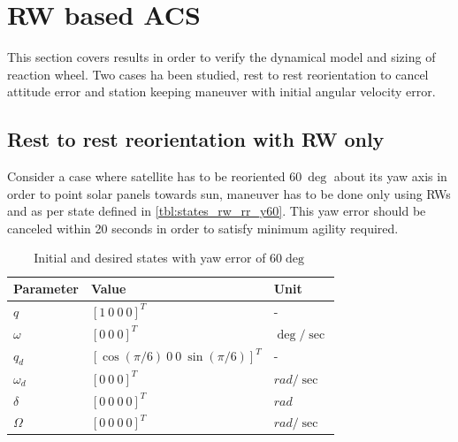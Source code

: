 \section{RW based ACS}
This section covers results in order to verify the dynamical model and sizing of reaction wheel. Two cases ha been studied, rest to rest reorientation to cancel attitude error and station keeping maneuver with initial angular velocity error.
\subsection{Rest to rest reorientation with RW only}
Consider a case where satellite has to be reoriented $\displaystyle 60\ \deg$ about its yaw axis in order to point solar panels towards sun, maneuver has to be done only using RWs and as per state defined in \autoref{tbl:states_rw_rr_y60}. This yaw error should be canceled within 20 seconds in order to satisfy minimum agility required.


\begin{table}[!h]
        \centering
        
\begin{tabular}{p{}|p{}|p{}}
\toprule
 Parameter & Value & Unit \\
\midrule
 $\displaystyle q$ & $\displaystyle [ 1\ 0\ 0\ 0]^{T}$ & - \\

 $\displaystyle \omega $ & $\displaystyle [ 0\ 0\ 0]^{T}$ & $\displaystyle \deg /\sec$ \\

 $\displaystyle q_{d}$ & $\displaystyle [\cos( \pi /6) \ 0\ 0\ \sin( \pi /6)]^{T}$ & - \\

 $\displaystyle \omega_d $ & $\displaystyle [ 0\ 0\ 0]^{T}$ & $\displaystyle rad/\sec$ \\

 $\displaystyle \delta $ & $\displaystyle [ 0\ 0\ 0\ 0]^{T}$ & $\displaystyle rad$ \\

 $\displaystyle \Omega $ & $\displaystyle [ 0\ 0\ 0\ 0]^{T}$ & $\displaystyle rad/\sec$ \\

 \bottomrule
\end{tabular}
        \caption{Initial and desired states with yaw error of $\displaystyle 60\deg$}
        \label{tbl:states_rw_rr_y60}
\end{table}

